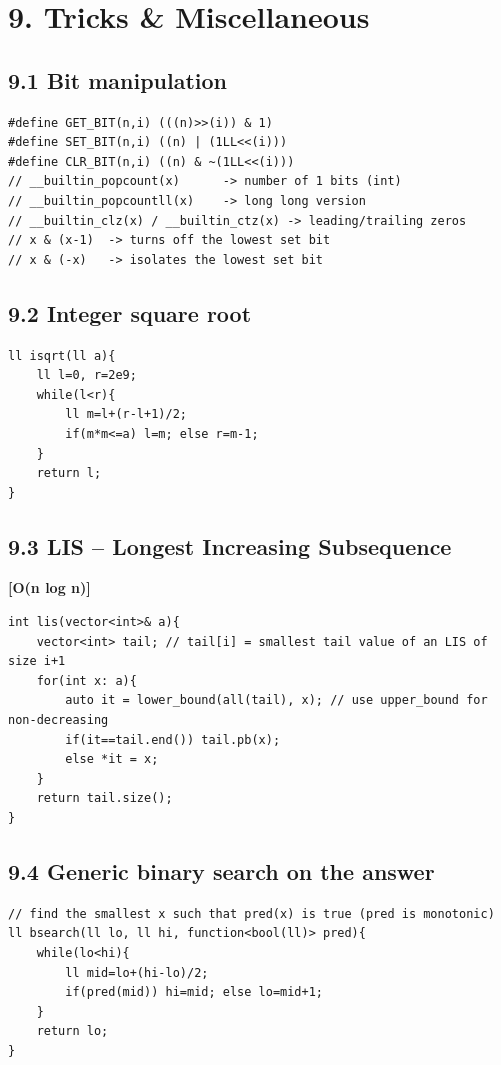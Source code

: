 \documentclass[11pt]{extarticle}
\newcommand{\comp}[1]{\textbf{[#1]}\\}
\begin{document}
\section*{9. Tricks \& Miscellaneous}
\subsection*{9.1 Bit manipulation}
\begin{lstlisting}
#define GET_BIT(n,i) (((n)>>(i)) & 1)
#define SET_BIT(n,i) ((n) | (1LL<<(i)))
#define CLR_BIT(n,i) ((n) & ~(1LL<<(i)))
// __builtin_popcount(x)      -> number of 1 bits (int)
// __builtin_popcountll(x)    -> long long version
// __builtin_clz(x) / __builtin_ctz(x) -> leading/trailing zeros
// x & (x-1)  -> turns off the lowest set bit
// x & (-x)   -> isolates the lowest set bit
\end{lstlisting}

\subsection*{9.2 Integer square root}
\begin{lstlisting}
ll isqrt(ll a){
    ll l=0, r=2e9;
    while(l<r){
        ll m=l+(r-l+1)/2;
        if(m*m<=a) l=m; else r=m-1;
    }
    return l;
}
\end{lstlisting}

\subsection*{9.3 LIS -- Longest Increasing Subsequence}
\comp{O(n log n)}
\begin{lstlisting}
int lis(vector<int>& a){
    vector<int> tail; // tail[i] = smallest tail value of an LIS of size i+1
    for(int x: a){
        auto it = lower_bound(all(tail), x); // use upper_bound for non-decreasing
        if(it==tail.end()) tail.pb(x);
        else *it = x;
    }
    return tail.size();
}
\end{lstlisting}

\subsection*{9.4 Generic binary search on the answer}
\begin{lstlisting}
// find the smallest x such that pred(x) is true (pred is monotonic)
ll bsearch(ll lo, ll hi, function<bool(ll)> pred){
    while(lo<hi){
        ll mid=lo+(hi-lo)/2;
        if(pred(mid)) hi=mid; else lo=mid+1;
    }
    return lo;
}
\end{lstlisting}
\end{document}
